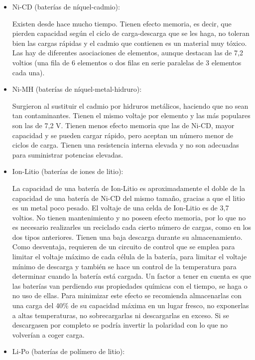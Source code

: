 \documentclass[12pt,twoside]{article}
\begin{document}
		\begin{itemize}
			\item Ni-CD (baterías de níquel-cadmio):

Existen desde hace mucho tiempo. Tienen efecto memoria, es decir, que pierden capacidad según el ciclo de carga-descarga que se les haga, no toleran bien las cargas rápidas y el cadmio que contienen es un material muy tóxico. Las hay de diferentes asociaciones de elementos, aunque destacan las de 7,2 voltios (una fila de 6 elementos o dos filas en serie paralelas de 3 elementos cada una).

			\item Ni-MH (baterías de níquel-metal-hidruro):

Surgieron al sustituir el cadmio por hidruros metálicos, haciendo que no sean tan contaminantes. Tienen el mismo voltaje por elemento y las más populares son las de 7,2 V. Tienen menos efecto memoria que las de Ni-CD, mayor capacidad y se pueden cargar rápido, pero aceptan un número menor de ciclos de carga. Tienen una resistencia interna elevada y no son adecuadas para suministrar potencias elevadas.

			\item Ion-Litio (baterías de iones de litio):

La capacidad de una batería de Ion-Litio es aproximadamente el doble de la capacidad de una batería de Ni-CD del mismo tamaño, gracias a que el litio es un metal poco pesado. El voltaje de una celda de Ion-Litio es de 3,7 voltios. No tienen mantenimiento y no poseen efecto memoria, por lo que no es necesario realizarles un reciclado cada cierto número de cargas, como en los dos tipos anteriores. Tienen una baja descarga durante su almacenamiento. Como desventaja, requieren de un circuito de control que se emplea para limitar el voltaje máximo de cada célula de la batería, para limitar el voltaje mínimo de descarga y también se hace un control de la temperatura para determinar cuando la batería está cargada. Un factor a tener en cuenta es que las baterías van perdiendo sus propiedades químicas con el tiempo, se haga o no uso de ellas. Para minimizar este efecto se recomienda almacenarlas con una carga del 40\% de su capacidad máxima en un lugar fresco, no exponerlas a altas temperaturas, no sobrecargarlas ni descargarlas en exceso. Si se descargasen por completo se podría invertir la polaridad con lo que no volverían a coger carga.
			\item Li-Po (baterías de polímero de litio):


\end{itemize}
\end{document}
